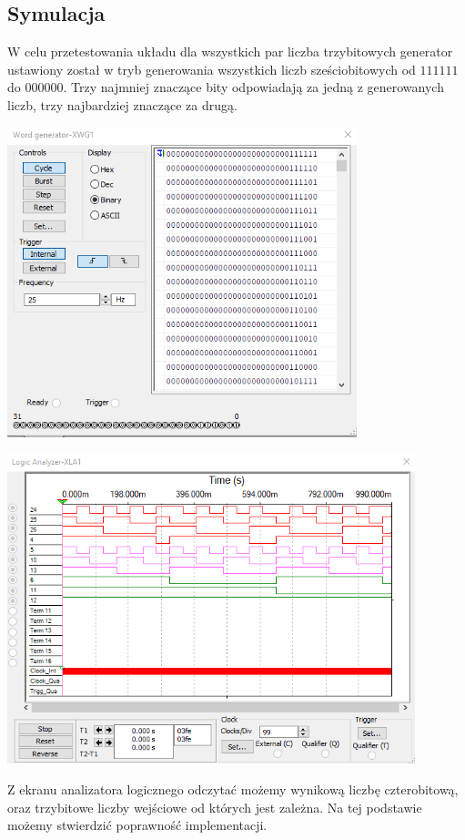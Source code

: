 \documentclass{article}
\begin{document}
        \subsection{Symulacja}
            W celu przetestowania układu dla wszystkich par liczba trzybitowych generator ustawiony został w tryb generowania wszystkich liczb sześciobitowych od $111111$ do $000000$. Trzy najmniej znaczące bity odpowiadają za jedną z generowanych liczb, trzy najbardziej znaczące za drugą.   
            \begin{center}
                \includegraphics[height=9cm]{reports/img/Z1A_gen.png}\\
            \end{center}
            \begin{center}
                \includegraphics[height=9cm]{reports/img/Z1A_analize.png}\\
            \end{center}
            Z ekranu analizatora logicznego odczytać możemy wynikową liczbę czterobitową, oraz trzybitowe liczby wejściowe od których jest zależna. Na tej podstawie możemy stwierdzić poprawność implementacji.
\end{document}
